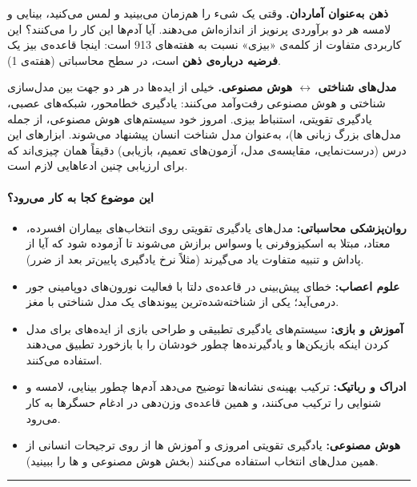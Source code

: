 \textbf{ذهن به‌عنوان آماردان.} وقتی یک شیء را هم‌زمان می‌بینید و لمس
می‌کنید، بینایی و لامسه هر دو برآوردی پرنویز از اندازه‌اش می‌دهند. آیا
آدم‌ها این کار را می‌کنند؟ این کاربردی متفاوت از کلمه‌ی «بیزی» نسبت به
هفته‌های 9\lr{--}13 است: اینجا قاعده‌ی بیز یک \textbf{فرضیه درباره‌ی ذهن} است،
در سطح محاسباتی  (هفته‌ی 1).

\textbf{مدل‌های شناختی \ensuremath{\leftrightarrow} هوش مصنوعی.} خیلی از ایده‌ها در هر دو جهت بین
مدل‌سازی شناختی و هوش مصنوعی رفت‌وآمد می‌کنند: یادگیری خطامحور، شبکه‌های
عصبی، یادگیری تقویتی، استنباط بیزی. امروز خود سیستم‌های هوش مصنوعی، از
جمله مدل‌های بزرگ زبانی ها)، به‌عنوان مدل شناخت انسان پیشنهاد
می‌شوند. ابزارهای این درس (درست‌نمایی، مقایسه‌ی مدل، آزمون‌های تعمیم،
بازیابی) دقیقاً همان چیزی‌اند که برای ارزیابی چنین ادعاهایی لازم است.

\paragraph{این موضوع کجا به کار می‌رود؟}

\begin{itemize}
\tightlist
\item
  \textbf{روان‌پزشکی محاسباتی:} مدل‌های یادگیری تقویتی روی انتخاب‌های
  بیماران افسرده، معتاد، مبتلا به اسکیزوفرنی یا وسواس برازش می‌شوند تا
  آزموده شود که آیا از پاداش و تنبیه متفاوت یاد می‌گیرند (مثلاً نرخ
  یادگیری پایین‌تر بعد از ضرر).
\item
  \textbf{علوم اعصاب:} خطای پیش‌بینی در قاعده‌ی دلتا با فعالیت نورون‌های
  دوپامینی جور درمی‌آید؛ یکی از شناخته‌شده‌ترین پیوندهای یک مدل شناختی با
  مغز.
\item
  \textbf{آموزش و بازی:} سیستم‌های یادگیری تطبیقی و طراحی بازی از ایده‌های
   برای مدل کردن اینکه بازیکن‌ها و یادگیرنده‌ها چطور خودشان را با
  بازخورد تطبیق می‌دهند استفاده می‌کنند.
\item
  \textbf{ادراک و رباتیک:} ترکیب بهینه‌ی نشانه‌ها توضیح می‌دهد آدم‌ها چطور
  بینایی، لامسه و شنوایی را ترکیب می‌کنند، و همین قاعده‌ی وزن‌دهی در ادغام
  حسگرها  به کار می‌رود.
\item
  \textbf{هوش مصنوعی:} یادگیری تقویتی امروزی و آموزش ها از
  روی ترجیحات انسانی  از همین مدل‌های انتخاب استفاده می‌کنند
  (بخش هوش مصنوعی و ها را ببینید).
\end{itemize}

\begin{center}\rule{0.5\linewidth}{0.5pt}\end{center}

